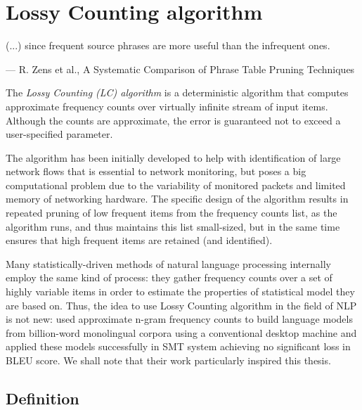 \chapter{Lossy Counting algorithm}
\label{chap:lossy-counting}

\setlength{\epigraphwidth}{1.0\textwidth}
\epigraph{(...) since frequent source phrases are more useful than the infrequent ones.}{--- R. Zens et al., A Systematic Comparison of Phrase Table Pruning Techniques}

The \emph{Lossy Counting (LC) algorithm} \citep{manku:lossycounting} is
a deterministic algorithm that computes approximate frequency counts
over virtually infinite stream of input items.
Although the counts are approximate, the error is guaranteed not to exceed
a user-specified parameter.

The algorithm has been initially developed to help with identification of
large network flows that is essential to network monitoring, but poses a big
computational problem due to the variability of monitored packets and limited
memory of networking hardware.
The specific design of the algorithm results in repeated pruning of low frequent
items from the frequency counts list, as the algorithm runs, and thus maintains
this list small-sized, but in the same time ensures that high frequent items are
retained (and identified).

Many statistically-driven methods of natural language processing internally
employ the same kind of process: they gather frequency counts over a set of highly
variable items in order to estimate the properties of statistical model they are
based on.
Thus, the idea to use Lossy Counting algorithm in the field of NLP is not new:
\citet{goyal:streaminglm} used approximate n-gram frequency counts to build language
models from billion-word monolingual corpora using a conventional desktop machine and
applied these models successfully in SMT system achieving no significant loss in BLEU
score. We shall note that their work particularly inspired this thesis.

\section{Definition}
\label{sec:lossy-counting-definition}

